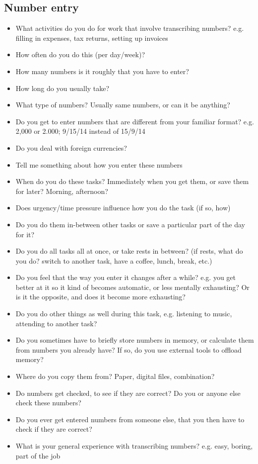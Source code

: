 \subsection{Number entry}
\begin{itemize}
\item  What activities do you do for work that involve transcribing numbers?
e.g. filling in expenses, tax returns, setting up invoices
\item How often do you do this (per day/week)?
\item How many numbers is it roughly that you have to enter?
\item How long do you usually take?
\item What type of numbers? Usually same numbers, or can it be anything?
\item Do you get to enter numbers that are different from your familiar format?
e.g. 2,000 or 2.000; 9/15/14 instead of 15/9/14
\item Do you deal with foreign currencies?
\item Tell me something about how you enter these numbers
\item When do you do these tasks? Immediately when you get them, or save them for later? Morning, afternoon?
\item Does urgency/time pressure influence how you do the task (if so, how)
\item Do you do them in-between other tasks or save a particular part of the day for it?
\item Do you do all tasks all at once, or take rests in between?
(if rests, what do you do? switch to another task, have a coffee, lunch, break, etc.)
\item Do you feel that the way you enter it changes after a while?
e.g. you get better at it so it kind of becomes automatic, or less mentally exhausting? Or is it the opposite, and does it become more exhausting?
\item Do you do other things as well during this task, e.g. listening to music, attending to another task?
\item Do you sometimes have to briefly store numbers in memory, or calculate them from numbers you already have?
If so, do you use external tools to offload memory?
\item Where do you copy them from? Paper, digital files, combination?
\item Do numbers get checked, to see if they are correct? Do you or anyone else check these numbers?
\item Do you ever get entered numbers from someone else, that you then have to check if they are correct?
\item What is your general experience with transcribing numbers? e.g. easy, boring, part of the job
\end{itemize}
